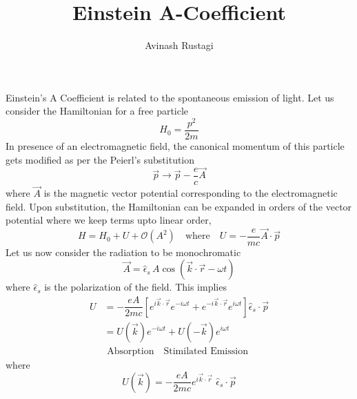 \documentclass[aps,prb,onecolumn,notitlepage,showpacs,floatfix,superscriptaddress]{revtex4-1}
\begin{document}
\title{Einstein A-Coefficient}

\author{Avinash Rustagi}
%

\maketitle
%

Einstein's A Coefficient is related to the spontaneous emission of light. Let us consider the Hamiltonian for a free particle
\begin{equation}
H_0 = \dfrac{p^2}{2m}
\end{equation}
In presence of an electromagnetic field, the canonical momentum of this particle gets modified as per the Peierl's substitution
\begin{equation}
\vec{p} \rightarrow \vec{p} - \dfrac{e}{c} \vec{A}
\end{equation}
where $\vec{A}$ is the magnetic vector potential corresponding to the electromagnetic field. Upon substitution, the Hamiltonian can be expanded in orders of the vector potential where we keep terms upto linear order,
\begin{equation}
H = H_0 + U + \mathcal{O}(A^2) \quad \text{where} \quad U = - \dfrac{e}{m c} \vec{A}\cdot \vec{p}
\end{equation}
Let us now consider the radiation to be monochromatic
\begin{equation}
\vec{A} = \hat{\epsilon}_s \, A \cos(\vec{k}\cdot\vec{r}-\omega t)
\end{equation}
where $\hat{\epsilon}_s$ is the polarization of the field. This implies
\begin{equation}
\begin{split}
U &= - \dfrac{eA}{2 m c} \left[ e^{i\vec{k}\cdot\vec{r}} e^{-i\omega t} + e^{-i\vec{k}\cdot\vec{r}} e^{i\omega t}\right] \hat{\epsilon}_s \cdot \vec{p} \\
&= U(\vec{k}) e^{-i\omega t} + U(-\vec{k}) e^{i\omega t}\\
& \, \, \text{Absorption} \quad \text{Stimilated Emission}
\end{split}
\end{equation}
where 
\begin{equation}
U(\vec{k}) = - \dfrac{eA}{2 m c} e^{i\vec{k}\cdot\vec{r}} \,\, \hat{\epsilon}_s \cdot \vec{p}
\end{equation}
\end{document}
